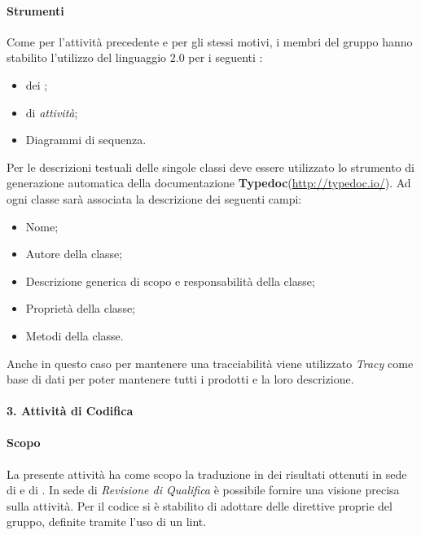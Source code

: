 		        \paragraph*{Strumenti}
		        Come per l'attivit\`a precedente e per gli stessi motivi, i membri del gruppo hanno stabilito l'utilizzo del linguaggio  2.0 per i seguenti
		        :
		        \begin{itemize}
			\item {} dei ; 
						
			\item {} di \textit{attivit\`a};
			\item Diagrammi di sequenza.
		        \end{itemize}
			Per le descrizioni testuali delle singole classi deve essere utilizzato lo strumento di generazione automatica della 
                        documentazione \textbf{Typedoc}(\url{http://typedoc.io/}). Ad ogni classe sarà associata la descrizione dei seguenti campi:
			\begin{itemize}
				\item Nome;
				\item Autore della classe;
				\item Descrizione generica di scopo e responsabilità della classe;
				\item Proprietà della classe;
				\item Metodi della classe.
			\end{itemize}
                        Anche in questo caso per mantenere una tracciabilità viene utilizzato \textit{Tracy} come base di dati per poter mantenere tutti i  prodotti e la loro descrizione.
			 
		
		\paragraph*{3. Attività di Codifica}

                \paragraph*{Scopo}
                La presente attivit\`a ha come scopo la traduzione in  dei risultati ottenuti in sede
                di  e di .
                In sede di \textit{Revisione di Qualifica} \`e possibile fornire una visione precisa sulla attivit\`a.
                Per il codice  si \`e stabilito di adottare delle direttive proprie del gruppo, definite tramite l'uso di un lint.
